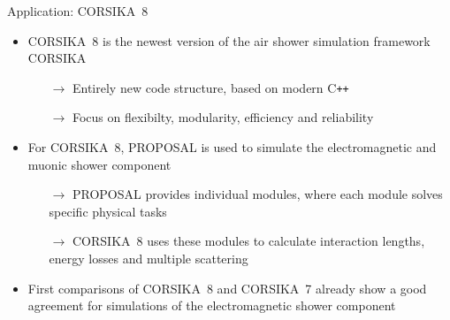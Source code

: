 \documentclass[t]{beamer}
\newlength{\thirdtextwidth}
\newlength{\itemseparation}
\begin{document}
  \begin{columns}[onlytextwidth]%
    \begin{column}{\thirdtextwidth}%
      \begin{block}[equal height group=B]{Application: CORSIKA~8}%
              \begin{itemize}
                \setlength\itemsep{\itemseparation}
                \item CORSIKA~8 is the newest version of the air shower simulation framework CORSIKA
                \begin{itemize}
                  \setlength\itemsep{\itemseparation}
                  \item[$\rightarrow$] Entirely new code structure, based on modern C\texttt{++} 
                  \item[$\rightarrow$] Focus on flexibilty, modularity, efficiency and reliability \cite{Engel2018}
                \end{itemize}
                \item For CORSIKA~8, PROPOSAL is used to simulate the electromagnetic and muonic shower component
                \begin{itemize}
                  \setlength\itemsep{\itemseparation}
                  \item[$\rightarrow$] PROPOSAL provides individual modules, where each module solves specific physical tasks \cite{Alameddine_2020}
                  \item[$\rightarrow$] CORSIKA~8 uses these modules to calculate interaction lengths, energy losses and multiple scattering 
                \end{itemize}
                \item First comparisons of CORSIKA~8 and CORSIKA~7 already show a good agreement for simulations of the electromagnetic shower component \cite{Alameddine:2021iq}
              \end{itemize}

        \vspace{2em}


\end{block}
\end{column}
\end{columns}
\end{document}
